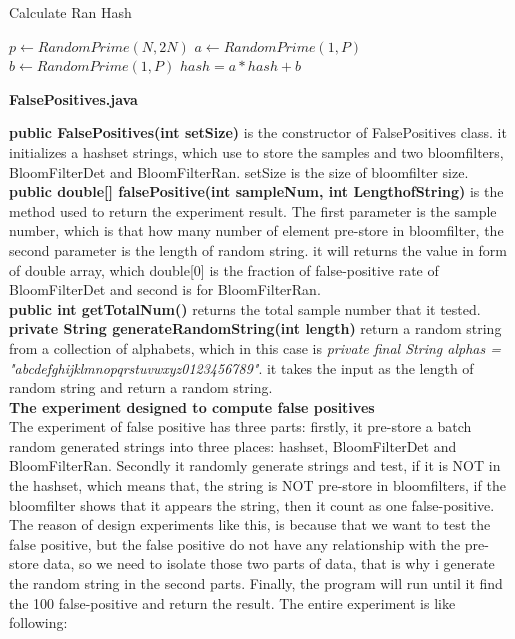 \documentclass[a4paper,14pt]{article}
\begin{document}
\begin{algorithm}
\caption{Calculate Ran Hash}
\begin{algorithmic}
\STATE $p \gets RandomPrime(N,2N)$
\STATE $a \gets RandomPrime(1,P)$
\STATE $b \gets RandomPrime(1,P)$
\STATE $hash = a* hash + b$
\ENDFOR
\end{algorithmic}
\end{algorithm} 


\clearpage

\begin{center}
\textbf{{\large FalsePositives.java}}
\end{center}
\textbf{public FalsePositives(int setSize)} is the constructor of FalsePositives class. it initializes a hashset strings, which use to store the samples and two bloomfilters, BloomFilterDet and BloomFilterRan. setSize is the size of bloomfilter size.
\\[6pt]
\textbf{public double[] falsePositive(int sampleNum, int LengthofString)} is the method used to return the experiment result. The first parameter is the sample number, which is that how many number of element pre-store in bloomfilter, the second parameter is the length of random string. it will returns the value in form of double array, which double[0] is the fraction of false-positive rate of BloomFilterDet and second is for BloomFilterRan.
\\[6pt]
\textbf{public int getTotalNum()} returns the total sample number that it tested.
\\[6pt]
\textbf{private String generateRandomString(int length)} return a random string from a collection of alphabets, which in this case is     
\emph{private final String alphas = "abcdefghijklmnopqrstuvwxyz0123456789"}. it takes the input as the length of random string and return a random string.
\\[6pt]
\textbf{The experiment designed to compute false positives}
\\[6pt]
The experiment of false positive has three parts: firstly, it pre-store a batch random generated strings into three places: hashset, BloomFilterDet and BloomFilterRan. Secondly it randomly generate strings and test, if it is NOT in the hashset, which means that, the string is NOT pre-store in bloomfilters, if the bloomfilter shows that it appears the string, then it count as one false-positive. The reason of design experiments like this, is because that we want to test the false positive, but the false positive do not have any relationship with the pre-store data, so we need to isolate those two parts of data, that is why i generate the random string in the second parts. Finally, the program will run until it find the 100 false-positive and return the result. The entire experiment is like following:
\end{document}
